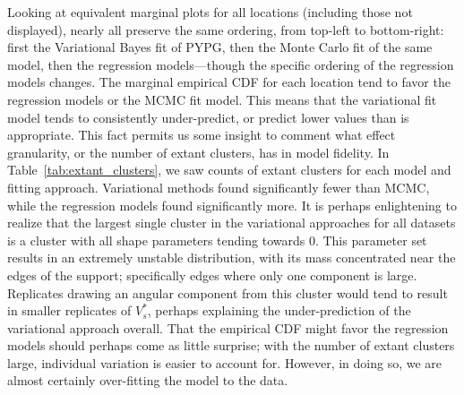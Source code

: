 % 

Looking at equivalent marginal plots for all locations (including those not displayed), nearly 
    all preserve the same ordering, from top-left to bottom-right: first the Variational Bayes 
    fit of PYPG, then the Monte Carlo fit of the same model, then the regression models---though 
    the specific ordering of the regression models changes.  The marginal empirical CDF for each 
    location tend to favor the regression models or the MCMC fit model.
    This means that the variational fit model 
    tends to consistently under-predict, or predict lower values than is appropriate. This fact
    permits us some insight to comment what effect granularity, or the number of extant clusters, 
    has in model fidelity.  In Table~\ref{tab:extant_clusters}, we saw counts of extant clusters
    for each model and fitting approach.  Variational methods found significantly fewer than MCMC, 
    while the regression models found significantly more.  It is perhaps enlightening to realize
    that the largest single cluster in the variational approaches for all datasets is a cluster
    with all shape parameters tending towards 0.  This parameter set results in an extremely unstable
    distribution, with its mass concentrated near the edges of the support; specifically edges
    where only one component is large.  Replicates drawing an angular component from this cluster 
    would tend to result in smaller replicates of $V_s^*$, perhaps explaining the under-prediction 
    of the variational approach overall.  That the empirical CDF might favor the regression models
    should perhaps come as little surprise; with the number of extant clusters large, individual 
    variation is easier to account for.  However, in doing so, we are almost certainly over-fitting
    the model to the data.
    

